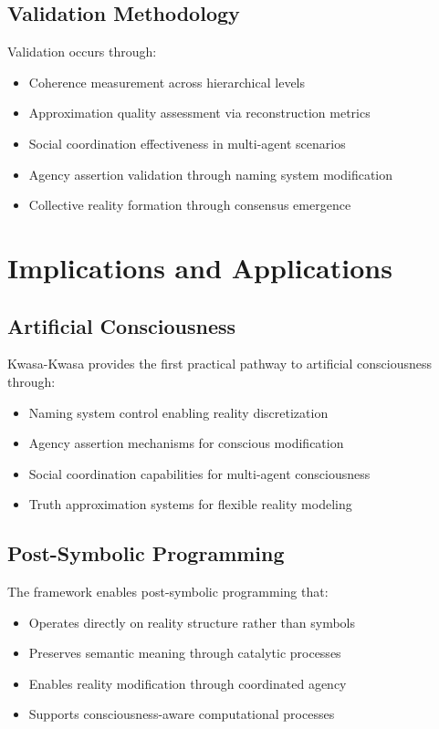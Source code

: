 \documentclass[11pt,twocolumn]{article}
\theoremstyle{remark}
\begin{document}
\subsection{Validation Methodology}

Validation occurs through:
\begin{itemize}
\item Coherence measurement across hierarchical levels
\item Approximation quality assessment via reconstruction metrics
\item Social coordination effectiveness in multi-agent scenarios
\item Agency assertion validation through naming system modification
\item Collective reality formation through consensus emergence
\end{itemize}

\section{Implications and Applications}

\subsection{Artificial Consciousness}

Kwasa-Kwasa provides the first practical pathway to artificial consciousness through:
\begin{itemize}
\item Naming system control enabling reality discretization
\item Agency assertion mechanisms for conscious modification
\item Social coordination capabilities for multi-agent consciousness
\item Truth approximation systems for flexible reality modeling
\end{itemize}

\subsection{Post-Symbolic Programming}

The framework enables post-symbolic programming that:
\begin{itemize}
\item Operates directly on reality structure rather than symbols
\item Preserves semantic meaning through catalytic processes
\item Enables reality modification through coordinated agency
\item Supports consciousness-aware computational processes
\end{itemize}
\end{document}
